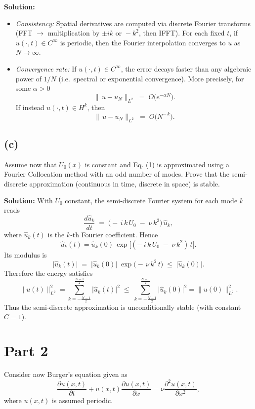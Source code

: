\documentclass{article}
\begin{document}
\textbf{Solution:}
\begin{itemize}
    \item \emph{Consistency:}  Spatial derivatives are computed via discrete Fourier transforms (FFT $\to$ multiplication by $\pm i k$ or $\!-k^2$, then IFFT).  For each fixed $t$, if $u(\cdot,t)\in C^\infty$ is periodic, then the Fourier interpolation converges to $u$ as $N\to\infty$.
    \item \emph{Convergence rate:}  If $u(\cdot,t)\in C^\infty$, the error decays faster than any algebraic power of $1/N$ (i.e.\ spectral or exponential convergence).  More precisely, for some $\alpha>0$
    \[
      \|\,u - u_N\|_{L^2} \;=\; O\!\bigl(e^{-\alpha N}\bigr).
    \]
    If instead $u(\cdot,t)\in H^k$, then
    \[
      \|\,u - u_N\|_{L^2} \;=\; O\bigl(N^{-\,k}\bigr).
    \]
\end{itemize}

\subsection*{(c)}
Assume now that $U_0(x)$ is constant and Eq. (1) is approximated using a Fourier Collocation method with an odd number of modes. Prove that the semi‐discrete approximation (continuous in time, discrete in space) is stable.

\textbf{Solution:}
With $U_0$ constant, the semi‐discrete Fourier system for each mode $k$ reads
\[
    \frac{d\hat{u}_k}{dt} \;=\; \bigl(-\,i\,k\,U_0 \;-\;\nu\,k^2 \bigr)\,\hat{u}_k,
\]
where $\hat{u}_k(t)$ is the $k$‐th Fourier coefficient.  Hence
\[
    \hat{u}_k(t)
    = \hat{u}_k(0)\,\exp\bigl[(-\,i\,k\,U_0 \;-\;\nu\,k^2)\,t\bigr].
\]
Its modulus is
\[
    \bigl|\hat{u}_k(t)\bigr|
    \;=\; \bigl|\hat{u}_k(0)\bigr|\;\exp\bigl(-\,\nu\,k^2\,t\bigr)
    \;\le\;\bigl|\hat{u}_k(0)\bigr|.
\]
Therefore the energy satisfies
\[
    \|u(t)\|_{L^2}^2 
    = \sum_{k=-\frac{N-1}{2}}^{\frac{N-1}{2}} \bigl|\hat{u}_k(t)\bigr|^2
    \;\le\; \sum_{k=-\frac{N-1}{2}}^{\frac{N-1}{2}} \bigl|\hat{u}_k(0)\bigr|^2
    = \|u(0)\|_{L^2}^2.
\]
Thus the semi‐discrete approximation is unconditionally stable (with constant $C=1$).



\section*{Part 2}
Consider now Burger's equation given as
\begin{equation}
    \frac{\partial u(x, t)}{\partial t} + u(x, t) \frac{\partial u(x, t)}{\partial x} = \nu \frac{\partial^2 u(x, t)}{\partial x^2},
\end{equation}
where $u(x, t)$ is assumed periodic. 
\end{document}
